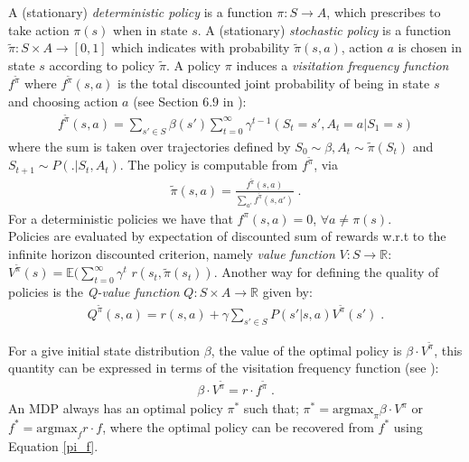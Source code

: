 \documentclass[sigconf]{aamas}  %
\begin{document}
A (stationary) \textit{deterministic policy} is a function $\pi: S \longrightarrow A$, which prescribes to take action $\pi(s)$ when in state $s$. A (stationary) \textit{stochastic policy} is a function $\tilde{\pi}: S \times A \longrightarrow [0,1]$ which indicates with probability $\tilde{\pi} (s,a)$, action $a$ is chosen in state $s$ according to policy $\tilde{\pi}$. A policy $\pi$ induces a \textit{visitation frequency function} $f^{\tilde{\pi}}$ where $f^{\tilde{\pi}}(s,a)$ is the total discounted joint probability of being in state $s$ and choosing action $a$ (see Section $6.9$ in \cite{Puterman1994}):
\begin{align*}
f^{\tilde{\pi}}(s, a) = \sum_{s' \in S} \beta(s') \sum_{t=0}^{\infty} \gamma^{t-1}(S_t = s', A_t = a | S_1 = s)
\end{align*}
where the sum is taken over trajectories defined by $S_0 \sim \beta, A_t \sim \tilde{\pi}(S_t)$ and $S_{t+1} \sim P(.|S_t,A_t)$. The policy is computable from $f^{\tilde{\pi}}$, via 
\begin{align}\label{pi_f}
\tilde{\pi}(s,a) = \frac{f^{\tilde{\pi}}(s, a)}{\sum_{a'} f^{\tilde{\pi}} (s,a')}\;.
\end{align}
For a deterministic policies we have that $f^{\pi}(s,a)= 0$, $\forall a \neq \pi(s)$.\\
Policies are evaluated by expectation of discounted sum of rewards w.r.t to the infinite horizon discounted criterion, namely \textit{value function} $V: S \longrightarrow \mathbb{R}$: 
$V^{\tilde{\pi}}(s) = \mathbb{E}(\sum_{t=0}^{\infty} \gamma^{t}$ $r(s_t, \tilde{\pi}(s_t))$. %
Another way for defining the quality of policies is the \textit{Q-value function}   $Q: S \times A \longrightarrow \mathbb{R}$ given by:
\begin{align}\label{q-v}
Q^{\tilde{\pi}}(s, a) = r(s, a) + \gamma \sum_{s' \in S} P(s'|s,a)V^{\tilde{\pi}}(s')\;.
\end{align}

For a give initial state distribution $\beta$, the value of the optimal policy is $\beta \cdot V^{\tilde{\pi}}$, this quantity can be expressed in terms of the visitation frequency function (see \cite{Puterman1994}): 
\begin{align}\label{f-v}
\beta \cdot V^{\tilde{\pi}} = r \cdot f^{\tilde{\pi}}\;.
\end{align}
An MDP always has an optimal policy $\pi^*$ such that; $\pi^* = \text{argmax}_{\pi} \beta \cdot V^{\pi}$ or $f^{*} = \text{argmax}_{f} r \cdot f$, where the optimal policy can be recovered from $f^*$ using Equation \ref{pi_f}. 
\end{document}
